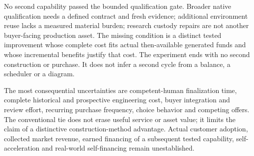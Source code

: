 No second capability passed the bounded qualification gate. Broader native qualification needs
a defined contract and fresh evidence; additional environment reuse lacks a measured material
burden; research custody repairs are not another buyer-facing production asset.
The missing condition is a distinct tested improvement whose complete cost fits actual
then-available generated funds and whose incremental benefits justify that cost.
The experiment ends with no second construction or purchase. It does not infer a second cycle
from a balance, a scheduler or a diagram.

The most consequential uncertainties are competent-human finalization time, complete historical
and prospective engineering cost, buyer integration and review effort, recurring purchase
frequency, choice behavior and competing offers. The conventional tie does not erase useful
service or asset value; it limits the claim of a distinctive construction-method advantage.
Actual customer adoption, collected market revenue, earned financing of a subsequent tested
capability, self-acceleration and real-world self-financing remain unestablished.
